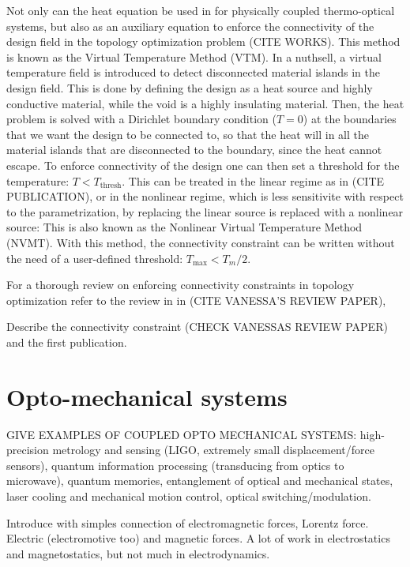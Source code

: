 Not only can the heat equation be used in for physically coupled thermo-optical systems,
but also as an auxiliary equation to enforce the connectivity of the design field in the 
topology optimization problem (CITE WORKS). This method is known as the Virtual Temperature
Method (VTM). In a nuthsell, a virtual temperature field is introduced to detect 
disconnected material islands in the design field. This is done by defining the design as a 
heat source and highly conductive material, while the void is a highly insulating material.
Then, the heat problem is solved with a Dirichlet boundary condition ($T = 0$) at the boundaries
that we want the design to be connected to, so that the heat will in all the
material islands that are disconnected to the boundary, since the heat cannot escape. To enforce
connectivity of the design one can then set a threshold for the temperature: $T < T_\text{thresh}$.
This can be treated in the linear regime as in (CITE PUBLICATION), or in the nonlinear regime, which
is less sensitivite with respect to the parametrization, by replacing the linear source is replaced 
with a nonlinear source:
This is also known as the Nonlinear Virtual Temperature Method (NVMT). With this method, 
the connectivity constraint can be written without the need of a user-defined threshold:
$T_\text{max} < T_m/2$.

For a thorough review on enforcing connectivity constraints in topology optimization
refer to the review in in (CITE VANESSA'S REVIEW PAPER),


Describe the connectivity constraint (CHECK VANESSAS REVIEW PAPER) and the first publication.

\section{Opto-mechanical systems}

GIVE EXAMPLES OF COUPLED OPTO MECHANICAL SYSTEMS: high-precision metrology and sensing (LIGO, extremely small displacement/force sensors),
quantum information processing (transducing from optics to microwave), quantum memories, 
entanglement of optical and mechanical states, laser cooling and mechanical motion control,
optical switching/modulation.

Introduce with simples connection of electromagnetic forces, Lorentz force. Electric (electromotive too) and 
magnetic forces. A lot of work in electrostatics and magnetostatics, but not much in
electrodynamics.

